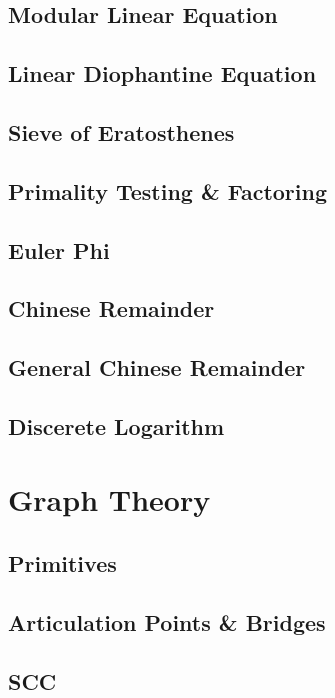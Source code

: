 		\subsection{Modular Linear Equation}
			
		\subsection{Linear Diophantine Equation}
			
		\subsection{Sieve of Eratosthenes}
			
		\subsection{Primality Testing \& Factoring}
			
		\subsection{Euler Phi}
			
		\subsection{Chinese Remainder}
			
		\subsection{General Chinese Remainder}
			
		\subsection{Discerete Logarithm}
			
	\section{Graph Theory}
		\subsection{Primitives}
			
		\subsection{Articulation Points \& Bridges}
			
		\subsection{SCC}
			
